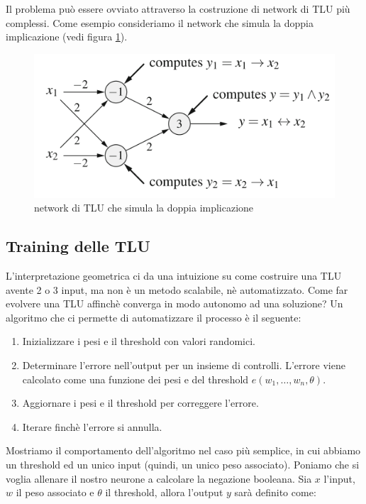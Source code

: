 \documentclass[10pt,a4paper]{article}
\begin{document}
Il problema può essere ovviato attraverso la costruzione di network di TLU più complessi. Come esempio consideriamo il network che simula la doppia implicazione (vedi figura \ref{fig:4}).

\begin{figure}
\centering
\includegraphics[scale=0.5]{img/netTLU.png}
\caption{network di TLU che simula la doppia implicazione}
\label{fig:4}
\end{figure}

\subsection{Training delle TLU}

L'interpretazione geometrica ci da una intuizione su come costruire una TLU avente 2 o 3 input, ma non è un metodo scalabile, nè automatizzato. Come far evolvere una TLU affinchè converga in modo autonomo ad una soluzione?
Un algoritmo che ci permette di automatizzare il processo è il seguente:

\begin{enumerate}
\item{Inizializzare i pesi e il threshold con valori randomici.}
\item{Determinare l'errore nell'output per un insieme di controlli. L'errore viene calcolato come una funzione dei pesi e del threshold $e(w_1,\dots,w_n,\theta)$.}
\item{Aggiornare i pesi e il threshold per correggere l'errore.}
\item{Iterare finchè l'errore si annulla.}
\end{enumerate}

Mostriamo il comportamento dell'algoritmo nel caso più semplice, in cui abbiamo un threshold ed un unico input (quindi, un unico peso associato). Poniamo che si voglia allenare il nostro neurone a calcolare la negazione booleana. Sia $x$ l'input, $w$ il peso associato e $\theta$ il threshold, allora l'output $y$ sarà definito come:
\end{document}
